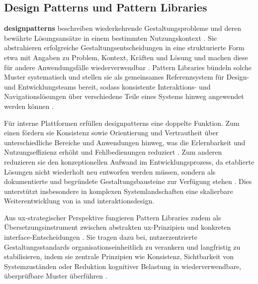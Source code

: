\subsection{Design Patterns und Pattern Libraries}
\label{subsec:02-02-02_design-patterns}

\textbf{\Gls{designpatterns}} beschreiben wiederkehrende Gestaltungsprobleme und deren bewährte Lösungsansätze in einem bestimmten Nutzungskontext \cite{411:Tidwell2020,602:Meszaros1997}. Sie abstrahieren erfolgreiche Gestaltungsentscheidungen in eine strukturierte Form etwa mit Angaben zu Problem, Kontext, Kräften und Lösung und machen diese für andere Anwendungsfälle wiederverwendbar \cite{602:Meszaros1997}. Pattern Libraries bündeln solche Muster systematisch und stellen sie als gemeinsames Referenzsystem für Design- und Entwicklungsteams bereit, sodass konsistente Interaktions- und Navigationslösungen über verschiedene Teile eines Systems hinweg angewendet werden können \cite{411:Tidwell2020,303:Rosenfeld2015}.

Für interne Plattformen erfüllen \Gls{designpatterns} eine doppelte Funktion. Zum einen fördern sie Konsistenz sowie Orientierung und Vertrautheit über unterschiedliche Bereiche und Anwendungen hinweg, was die Erlernbarkeit und Nutzungseffizienz erhöht und Fehlbedienungen reduziert \cite{300:FraunhoferIESE2018,411:Tidwell2020}. Zum anderen reduzieren sie den konzeptionellen Aufwand im Entwicklungsprozess, da etablierte Lösungen nicht wiederholt neu entworfen werden müssen, sondern als dokumentierte und begründete Gestaltungsbausteine zur Verfügung stehen \cite{602:Meszaros1997,406:Albers2015}. Dies unterstützt insbesondere in komplexen Systemlandschaften eine skalierbare Weiterentwicklung von \Gls{ia} und \Gls{interaktionsdesign}.

Aus \Gls{ux}-strategischer Perspektive fungieren Pattern Libraries zudem als Übersetzungsinstrument zwischen abstrakten \Gls{ux}-Prinzipien und konkreten \Gls{interface}-Entscheidungen \cite{406:Albers2015,408:Hassenzahl2010}. Sie tragen dazu bei, nutzerzentrierte Gestaltungsstandards organisationseinheitlich zu verankern und langfristig zu stabilisieren, indem sie zentrale Prinzipien wie Konsistenz, Sichtbarkeit von Systemzuständen oder Reduktion kognitiver Belastung in wiederverwendbare, überprüfbare Muster überführen \cite{401:Garrett2011,105:Sweller1988}.

\newpage
